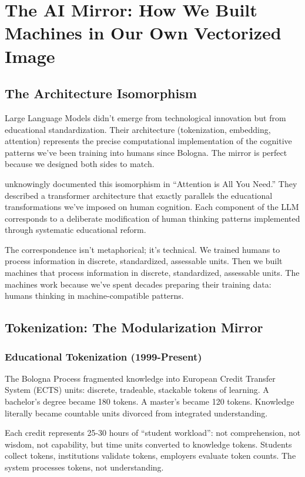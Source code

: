 \section{The AI Mirror: How We Built Machines in Our Own Vectorized Image}

\subsection{The Architecture Isomorphism}

Large Language Models didn't emerge from technological innovation but from educational standardization. Their architecture (tokenization, embedding, attention) represents the precise computational implementation of the cognitive patterns we've been training into humans since Bologna. The mirror is perfect because we designed both sides to match.

\citet{vaswani2017} unknowingly documented this isomorphism in ``Attention is All You Need.'' They described a transformer architecture that exactly parallels the educational transformations we've imposed on human cognition. Each component of the LLM corresponds to a deliberate modification of human thinking patterns implemented through systematic educational reform.

The correspondence isn't metaphorical; it's technical. We trained humans to process information in discrete, standardized, assessable units. Then we built machines that process information in discrete, standardized, assessable units. The machines work because we've spent decades preparing their training data: humans thinking in machine-compatible patterns.

\subsection{Tokenization: The Modularization Mirror}

\subsubsection{Educational Tokenization (1999-Present)}

The Bologna Process fragmented knowledge into European Credit Transfer System (ECTS) units: discrete, tradeable, stackable tokens of learning. A bachelor's degree became 180 tokens. A master's became 120 tokens. Knowledge literally became countable units divorced from integrated understanding.

Each credit represents 25-30 hours of ``student workload'': not comprehension, not wisdom, not capability, but time units converted to knowledge tokens. Students collect tokens, institutions validate tokens, employers evaluate token counts. The system processes tokens, not understanding.

